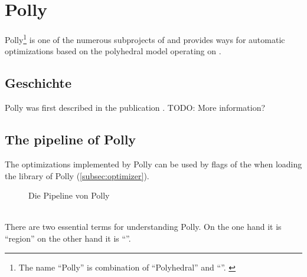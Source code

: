 \chapter{Polly}
Polly\footnote{The name \enquote{Polly} is combination of \enquote{Polyhedral} and \enquote{\llvm}. \cite{PollyGrosser}} is one of the numerous subprojects of \llvm and provides ways for automatic optimizations based on the polyhedral model operating on \llvmir.

\section{Geschichte}
Polly was first described in the publication \cite{PollyGrosser}. TODO: More information?

\section{The pipeline of Polly}
The optimizations implemented by Polly can be used by flags of the \opt when loading the library of Polly (\autoref{subsec:optimizer}).
\begin{figure}[h]
    \caption{Die Pipeline von Polly \cite{PollyPresentation}}
    \centering
\end{figure}\\
There are two essential terms for understanding Polly. On the one hand it is \enquote{region} on the other hand it is \enquote{\scop}.
